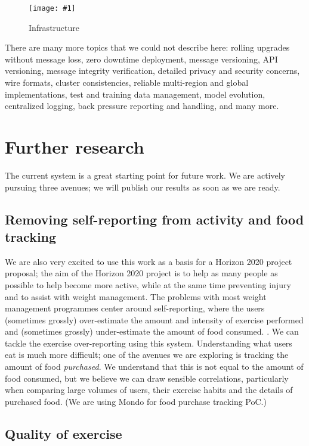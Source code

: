 \documentclass[a4paper, 10 pt, conference]{IEEEtran}
\newcommand{\fig}[3]{
  \begin{figure}[h]
    \begin{center}
        \caption{#3}
        \texttt{[image: \#1]}
        \label{fig:#2}
    \end{center}
  \end{figure}
}
\begin{document}
\fig{ri-infrastructure.png}{ri-infrastructure}{Infrastructure}

There are many more topics that we could not describe here: rolling upgrades without message loss, zero downtime deployment, message versioning, API versioning, message integrity verification, detailed privacy and security concerns, wire formats, cluster consistencies, reliable multi-region and global implementations, test and training data management, model evolution, centralized logging, back pressure reporting and handling, and many more. 

\section{Further research}

The current system is a great starting point for future work. We are actively pursuing three avenues; we will publish our results as soon as we are ready.

\subsection{Removing self-reporting from activity and food tracking}

We are also very excited to use this work as a basis for a Horizon 2020 \cite{horizon2020} project proposal; the aim of the Horizon 2020 project is to help as many people as possible to help become more active, while at the same time preventing injury and to assist with weight management. The problems with most weight management programmes center around self-reporting, where the users (sometimes grossly) over-estimate the amount and intensity of exercise performed and (sometimes grossly) under-estimate the amount of food consumed. \cite{!!!}. We can tackle the exercise over-reporting using this system. Understanding what users eat is much more difficult; one of the avenues we are exploring is tracking the amount of food \emph{purchased}. We understand that this is not equal to the amount of food consumed, but we believe we can draw sensible correlations, particularly when comparing large volumes of users, their exercise habits and the details of purchased food. (We are using Mondo \cite{mondo} for food purchase tracking PoC.)

\subsection{Quality of exercise}
\end{document}

